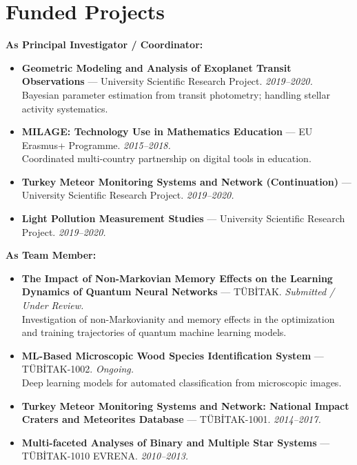 \documentclass[11pt,a4paper]{article}
\begin{document}
\section{Funded Projects}

\textbf{As Principal Investigator / Coordinator:}
\begin{itemize}
    \item \textbf{Geometric Modeling and Analysis of Exoplanet Transit Observations} --- University Scientific Research Project. \textit{2019--2020.}\\
    Bayesian parameter estimation from transit photometry; handling stellar activity systematics.

    \item \textbf{MILAGE: Technology Use in Mathematics Education} --- EU Erasmus+ Programme. \textit{2015--2018.}\\
    Coordinated multi-country partnership on digital tools in education.

    \item \textbf{Turkey Meteor Monitoring Systems and Network (Continuation)} --- University Scientific Research Project. \textit{2019--2020.}

    \item \textbf{Light Pollution Measurement Studies} --- University Scientific Research Project. \textit{2019--2020.}
\end{itemize}

\textbf{As Team Member:}
\begin{itemize}
    \item \textbf{The Impact of Non-Markovian Memory Effects on the Learning Dynamics of Quantum Neural Networks} --- TÜBİTAK. \textit{Submitted / Under Review.}\\
    Investigation of non-Markovianity and memory effects in the optimization and training trajectories of quantum machine learning models.

    \item \textbf{ML-Based Microscopic Wood Species Identification System} --- TÜBİTAK-1002. \textit{Ongoing.}\\
    Deep learning models for automated classification from microscopic images.

    \item \textbf{Turkey Meteor Monitoring Systems and Network: National Impact Craters and Meteorites Database} --- TÜBİTAK-1001. \textit{2014--2017.}

    \item \textbf{Multi-faceted Analyses of Binary and Multiple Star Systems} --- TÜBİTAK-1010 EVRENA. \textit{2010--2013.}
\end{itemize}
\end{document}
